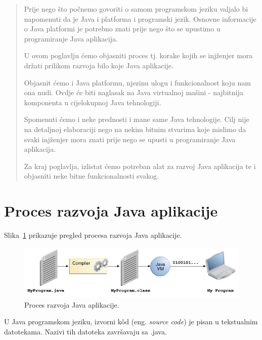 \label{chap:java_technology}
\begin{abstract}
    Prije nego što počnemo govoriti o samom programskom jeziku valjalo bi napomenuti da je Java i platforma i programski jezik. Osnovne informacije o Java platformi je potrebno znati prije nego što se upustimo u programiranje Java aplikacija.
    
    U ovom poglavlju ćemo objasniti proces tj. korake kojih se injženjer mora držati prilikom razvoja bilo koje Java aplikacije.
    
    Objasnit ćemo i Java platformu, njezinu ulogu i funkcionalnost koju nam ona nudi. Ovdje će biti naglasak na Java virtualnoj mašini - najbitnija komponenta u cijelokupnoj Java tehnologiji.
    
    Spomenuti ćemo i neke prednosti i mane same Java tehnologije. Cilj nije na detaljnoj elaboraciji nego na nekim bitnim stvarima koje mislimo da svaki injženjer mora znati prije nego se upusti u programiranje Java aplikacija.
    
    Za kraj poglavlja, izlistat ćemo potreban alat za razvoj Java aplikacija te i objasniti neke bitne funkcionalnosti svakog.
\end{abstract}

\section{Proces razvoja Java aplikacije}
Slika~\ref{fig:software_development_process} prikazuje pregled procesa razvoja Java aplikacije.~\cite{javatutorials}

\begin{figure}[h!]
    \caption{Proces razvoja Java aplikacije.}
    \label{fig:software_development_process}
    \centering
    \includegraphics[width=\textwidth]{images/software_development_process}
\end{figure}

U Java programskom jeziku, izvorni kôd (eng. \emph{source code}) je pisan u tekstualnim datotekama. Nazivi tih datoteka završavaju sa .java.

